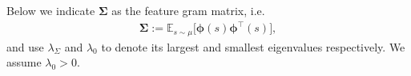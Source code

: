  Below we indicate $\bm{\Sigma}$ as the feature gram matrix, i.e.
\begin{align}\label{eq:defn-Sigma}
	\bm{\Sigma} := \mathbb{E}_{s \sim \mu } \Big[\bm{\phi}(s)\bm{\phi}^\top(s)\Big],
\end{align}
and use $\lambda_{\Sigma}$ and $\lambda_0$ to denote its largest and smallest eigenvalues respectively. We assume $\lambda_0 > 0$.

